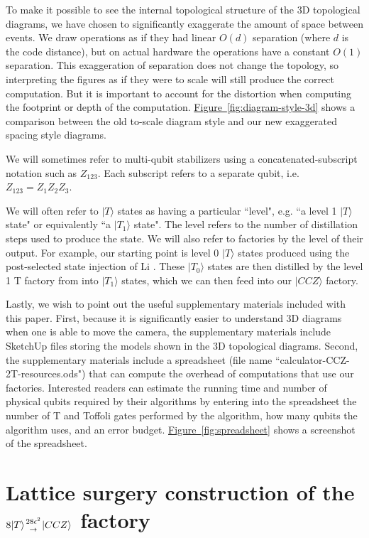 \documentclass[twocolumn,accepted=2019-03-30]{quantumarticle}
\newcommand{\fig}[1]{\hyperref[fig:#1]{Figure~\ref*{fig:#1}}}
\newcommand{\factory}[3]{$#1 \genfrac{}{}{0pt}{}{#2}{\rightarrow} {#3}$ factory}
\begin{document}
To make it possible to see the internal topological structure of the 3D topological diagrams, we have chosen to significantly exaggerate the amount of space between events.
We draw operations as if they had linear $O(d)$ separation (where $d$ is the code distance), but on actual hardware the operations have a constant $O(1)$ separation.
This exaggeration of separation does not change the topology, so interpreting the figures as if they were to scale will still produce the correct computation.
But it is important to account for the distortion when computing the footprint or depth of the computation.
\fig{diagram-style-3d} shows a comparison between the old to-scale diagram style and our new exaggerated spacing style diagrams.

We will sometimes refer to multi-qubit stabilizers using a concatenated-subscript notation such as $Z_{123}$.
Each subscript refers to a separate qubit, i.e. $Z_{123} = Z_1 Z_2 Z_3$.

We will often refer to $|T\rangle$ states as having a particular ``level", e.g. ``a level 1 $|T\rangle$ state" or equivalently ``a $|T_1\rangle$ state".
The level refers to the number of distillation steps used to produce the state.
We will also refer to factories by the level of their output.
For example, our starting point is level 0 $|T\rangle$ states produced using the post-selected state injection of Li \cite{li2015}.
These $|T_0\rangle$ states are then distilled by the level 1 T factory from \cite{fowler2018} into $|T_1\rangle$ states, which we can then feed into our $|CCZ\rangle$ factory.

Lastly, we wish to point out the useful supplementary materials included with this paper.
First, because it is significantly easier to understand 3D diagrams when one is able to move the camera, the supplementary materials include SketchUp files storing the models shown in the 3D topological diagrams.
Second, the supplementary materials include a spreadsheet (file name ``calculator-CCZ-2T-resources.ods") that can compute the overhead of computations that use our factories.
Interested readers can estimate the running time and number of physical qubits required by their algorithms by entering into the spreadsheet the number of T and Toffoli gates performed by the algorithm, how many qubits the algorithm uses, and an error budget.
\fig{spreadsheet} shows a screenshot of the spreadsheet.






\section{\texorpdfstring{
    Lattice surgery construction of the \factory{8|T\rangle}{28\epsilon^2}{|CCZ\rangle}
}{
    Lattice surgery construction of the 8T to CCZ  factory
}}
\label{sec:ccz}
\end{document}
